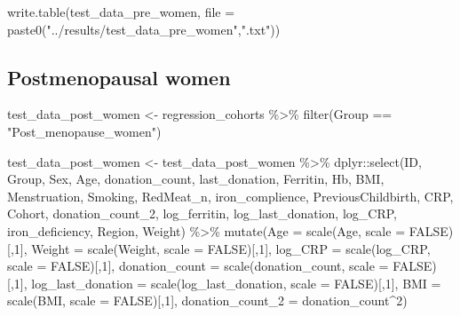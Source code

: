 \documentclass[
]{article}
\newenvironment{Shaded}{\begin{snugshade}}{\end{snugshade}}
\newcommand{\AttributeTok}[1]{\textcolor[rgb]{0.77,0.63,0.00}{#1}}
\newcommand{\ConstantTok}[1]{\textcolor[rgb]{0.00,0.00,0.00}{#1}}
\newcommand{\DecValTok}[1]{\textcolor[rgb]{0.00,0.00,0.81}{#1}}
\newcommand{\FunctionTok}[1]{\textcolor[rgb]{0.00,0.00,0.00}{#1}}
\newcommand{\NormalTok}[1]{#1}
\newcommand{\OtherTok}[1]{\textcolor[rgb]{0.56,0.35,0.01}{#1}}
\newcommand{\SpecialCharTok}[1]{\textcolor[rgb]{0.00,0.00,0.00}{#1}}
\newcommand{\StringTok}[1]{\textcolor[rgb]{0.31,0.60,0.02}{#1}}
\begin{document}
\begin{Shaded}
\begin{Highlighting}[]
\FunctionTok{write.table}\NormalTok{(test\_data\_pre\_women, }\AttributeTok{file =} \FunctionTok{paste0}\NormalTok{(}\StringTok{"../results/test\_data\_pre\_women"}\NormalTok{,}\StringTok{".txt"}\NormalTok{))}
\end{Highlighting}
\end{Shaded}

\hypertarget{postmenopausal-women}{%
\subsection{Postmenopausal women}\label{postmenopausal-women}}

\begin{Shaded}
\begin{Highlighting}[]
\NormalTok{test\_data\_post\_women }\OtherTok{\textless{}{-}}\NormalTok{ regression\_cohorts }\SpecialCharTok{\%\textgreater{}\%} 
  \FunctionTok{filter}\NormalTok{(Group }\SpecialCharTok{==} \StringTok{"Post\_menopause\_women"}\NormalTok{) }

\NormalTok{test\_data\_post\_women }\OtherTok{\textless{}{-}}\NormalTok{ test\_data\_post\_women }\SpecialCharTok{\%\textgreater{}\%} 
\NormalTok{  dplyr}\SpecialCharTok{::}\FunctionTok{select}\NormalTok{(ID, Group, Sex, Age, donation\_count, last\_donation, Ferritin, Hb, BMI, Menstruation, Smoking, RedMeat\_n, iron\_complience, PreviousChildbirth, CRP, Cohort, donation\_count\_2, log\_ferritin, log\_last\_donation, log\_CRP, iron\_deficiency, Region, Weight) }\SpecialCharTok{\%\textgreater{}\%}
  \FunctionTok{mutate}\NormalTok{(}\AttributeTok{Age =} \FunctionTok{scale}\NormalTok{(Age, }\AttributeTok{scale =} \ConstantTok{FALSE}\NormalTok{)[,}\DecValTok{1}\NormalTok{],}
         \AttributeTok{Weight =} \FunctionTok{scale}\NormalTok{(Weight, }\AttributeTok{scale =} \ConstantTok{FALSE}\NormalTok{)[,}\DecValTok{1}\NormalTok{],}
         \AttributeTok{log\_CRP =} \FunctionTok{scale}\NormalTok{(log\_CRP, }\AttributeTok{scale =} \ConstantTok{FALSE}\NormalTok{)[,}\DecValTok{1}\NormalTok{],}
         \AttributeTok{donation\_count =} \FunctionTok{scale}\NormalTok{(donation\_count, }\AttributeTok{scale =} \ConstantTok{FALSE}\NormalTok{)[,}\DecValTok{1}\NormalTok{],}
         \AttributeTok{log\_last\_donation =} \FunctionTok{scale}\NormalTok{(log\_last\_donation, }\AttributeTok{scale =} \ConstantTok{FALSE}\NormalTok{)[,}\DecValTok{1}\NormalTok{],}
         \AttributeTok{BMI =} \FunctionTok{scale}\NormalTok{(BMI, }\AttributeTok{scale =} \ConstantTok{FALSE}\NormalTok{)[,}\DecValTok{1}\NormalTok{],}
         \AttributeTok{donation\_count\_2 =}\NormalTok{ donation\_count}\SpecialCharTok{\^{}}\DecValTok{2}\NormalTok{)}
\end{Highlighting}
\end{Shaded}
\end{document}
